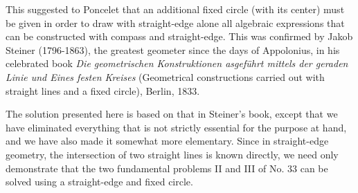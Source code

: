 This suggested to Poncelet that an additional fixed circle (with its center) must be given in order to draw with straight-edge alone all algebraic expressions that can be constructed with compass and straight-edge. This was confirmed by Jakob Steiner (1796-1863), the greatest geometer since the days of Appolonius, in his celebrated book \textit{Die geometrischen Konstruktionen asgef\"{u}hrt mittels der geraden Linie und Eines festen Kreises} (Geometrical constructions carried out with straight lines and a fixed circle), Berlin, 1833. 

The solution presented here is based on that in Steiner's book, except that we have eliminated everything that is not strictly essential for the purpose at hand, and we have also made it somewhat more elementary. Since in straight-edge geometry, the intersection of two straight lines is known directly, we need only demonstrate that the two fundamental problems II and III of No. 33 can be solved using a straight-edge and fixed circle. 
